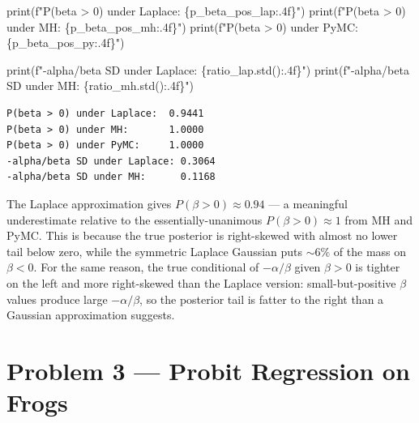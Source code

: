 \documentclass[
  letterpaper,
  DIV=11,
  numbers=noendperiod]{scrartcl}
\newenvironment{Shaded}{\begin{snugshade}}{\end{snugshade}}
\newcommand{\BuiltInTok}[1]{\textcolor[rgb]{0.00,0.23,0.31}{#1}}
\newcommand{\NormalTok}[1]{\textcolor[rgb]{0.00,0.23,0.31}{#1}}
\newcommand{\SpecialCharTok}[1]{\textcolor[rgb]{0.37,0.37,0.37}{#1}}
\newcommand{\SpecialStringTok}[1]{\textcolor[rgb]{0.13,0.47,0.30}{#1}}
\begin{document}
\begin{Shaded}
\begin{Highlighting}[]
\BuiltInTok{print}\NormalTok{(}\SpecialStringTok{f"P(beta \textgreater{} 0) under Laplace:  }\SpecialCharTok{\{}\NormalTok{p\_beta\_pos\_lap}\SpecialCharTok{:.4f\}}\SpecialStringTok{"}\NormalTok{)}
\BuiltInTok{print}\NormalTok{(}\SpecialStringTok{f"P(beta \textgreater{} 0) under MH:       }\SpecialCharTok{\{}\NormalTok{p\_beta\_pos\_mh}\SpecialCharTok{:.4f\}}\SpecialStringTok{"}\NormalTok{)}
\BuiltInTok{print}\NormalTok{(}\SpecialStringTok{f"P(beta \textgreater{} 0) under PyMC:     }\SpecialCharTok{\{}\NormalTok{p\_beta\_pos\_py}\SpecialCharTok{:.4f\}}\SpecialStringTok{"}\NormalTok{)}

\BuiltInTok{print}\NormalTok{(}\SpecialStringTok{f"{-}alpha/beta SD under Laplace: }\SpecialCharTok{\{}\NormalTok{ratio\_lap}\SpecialCharTok{.}\NormalTok{std()}\SpecialCharTok{:.4f\}}\SpecialStringTok{"}\NormalTok{)}
\BuiltInTok{print}\NormalTok{(}\SpecialStringTok{f"{-}alpha/beta SD under MH:      }\SpecialCharTok{\{}\NormalTok{ratio\_mh}\SpecialCharTok{.}\NormalTok{std()}\SpecialCharTok{:.4f\}}\SpecialStringTok{"}\NormalTok{)}
\end{Highlighting}
\end{Shaded}

\begin{verbatim}
P(beta > 0) under Laplace:  0.9441
P(beta > 0) under MH:       1.0000
P(beta > 0) under PyMC:     1.0000
-alpha/beta SD under Laplace: 0.3064
-alpha/beta SD under MH:      0.1168
\end{verbatim}

The Laplace approximation gives \(P(\beta>0) \approx 0.94\) --- a
meaningful underestimate relative to the essentially-unanimous
\(P(\beta>0) \approx 1\) from MH and PyMC. This is because the true
posterior is right-skewed with almost no lower tail below zero, while
the symmetric Laplace Gaussian puts \(\sim 6\%\) of the mass on
\(\beta<0\). For the same reason, the true conditional of
\(-\alpha/\beta\) given \(\beta>0\) is tighter on the left and more
right-skewed than the Laplace version: small-but-positive \(\beta\)
values produce large \(-\alpha/\beta\), so the posterior tail is fatter
to the right than a Gaussian approximation suggests.

\newpage

\section{Problem 3 --- Probit Regression on
Frogs}\label{problem-3-probit-regression-on-frogs}
\end{document}
